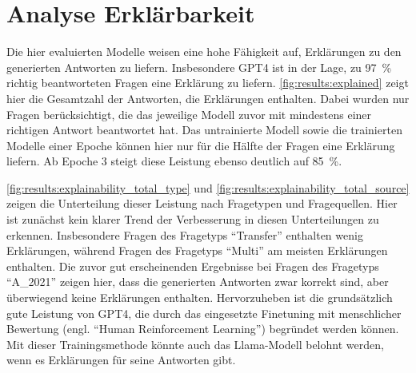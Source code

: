 \section{Analyse Erklärbarkeit}\label{sec:results:explainability}
Die hier evaluierten Modelle weisen eine hohe Fähigkeit auf, Erklärungen zu den generierten Antworten zu liefern.
Insbesondere GPT4 ist in der Lage, zu \SI{97}{\percent} richtig beantworteten Fragen eine Erklärung zu liefern.
\cref{fig:results:explained} zeigt hier die Gesamtzahl der Antworten, die Erklärungen enthalten.
Dabei wurden nur Fragen berücksichtigt, die das jeweilige Modell zuvor mit mindestens einer richtigen Antwort beantwortet hat.
Das untrainierte Modell sowie die trainierten Modelle einer Epoche können hier nur für die Hälfte der Fragen eine Erklärung liefern.
Ab Epoche 3 steigt diese Leistung ebenso deutlich auf \SI{85}{\percent}.\\


\cref{fig:results:explainability_total_type} und \cref{fig:results:explainability_total_source} zeigen die Unterteilung dieser Leistung nach Fragetypen und Fragequellen.
Hier ist zunächst kein klarer Trend der Verbesserung in diesen Unterteilungen zu erkennen.
Insbesondere Fragen des Fragetyps \enquote{Transfer} enthalten wenig Erklärungen, während Fragen des Fragetyps \enquote{Multi} am meisten Erklärungen enthalten.
Die zuvor gut erscheinenden Ergebnisse bei Fragen des Fragetyps \enquote{A\_2021} zeigen hier, dass die generierten Antworten zwar korrekt sind, aber überwiegend keine Erklärungen enthalten.
Hervorzuheben ist die grundsätzlich gute Leistung von GPT4, die durch das eingesetzte Finetuning mit menschlicher Bewertung (engl.
\enquote{Human Reinforcement Learning}) begründet werden können.
Mit dieser Trainingsmethode könnte auch das Llama-Modell belohnt werden, wenn es Erklärungen für seine Antworten gibt.\\

